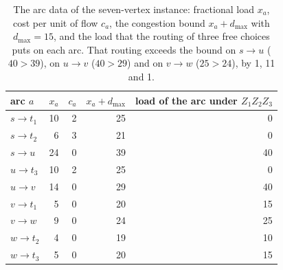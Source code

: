 \begin{table}[t]
\centering\small
\begin{tabular}{@{}lrrrr@{}}
\toprule
arc $a$ & $x_a$ & $c_a$ & $x_a+d_{\max}$ & load of the arc under $Z_1Z_2Z_3$\\
\midrule
$s\to t_1$ & 10 & 2 & 25 & 0\\
$s\to t_2$ & 6 & 3 & 21 & 0\\
$s\to u$ & 24 & 0 & 39 & 40\\
$u\to t_3$ & 10 & 2 & 25 & 0\\
$u\to v$ & 14 & 0 & 29 & 40\\
$v\to t_1$ & 5 & 0 & 20 & 15\\
$v\to w$ & 9 & 0 & 24 & 25\\
$w\to t_2$ & 4 & 0 & 19 & 10\\
$w\to t_3$ & 5 & 0 & 20 & 15\\
\bottomrule
\end{tabular}
\caption{The arc data of the seven-vertex instance: fractional load $x_a$, cost per unit of flow $c_a$, the congestion bound $x_a+d_{\max}$ with $d_{\max}=15$, and the load that the routing of three free choices puts on each arc. That routing exceeds the bound on $s\to u$ ($40>39$), on $u\to v$ ($40>29$) and on $v\to w$ ($25>24$), by 1, 11 and 1.}
\label{tab:arcs7}
\end{table}
